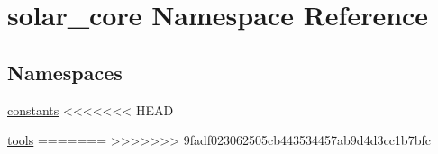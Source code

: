 \hypertarget{namespacesolar__core}{}\section{solar\+\_\+core Namespace Reference}
\label{namespacesolar__core}
\subsection*{Namespaces}
\begin{DoxyCompactItemize}
\item 
 \hyperlink{namespacesolar__core_1_1constants}{constants}
<<<<<<< HEAD
\item 
 \hyperlink{namespacesolar__core_1_1tools}{tools}
=======
>>>>>>> 9fadf023062505cb443534457ab9d4d3cc1b7bfc
\end{DoxyCompactItemize}
